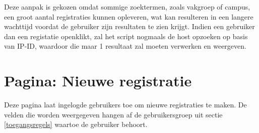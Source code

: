 Deze aanpak is gekozen omdat sommige zoektermen, zoals vakgroep of campus, een groot aantal registraties kunnen opleveren, wat kan resulteren in een langere wachttijd voordat de gebruiker zijn resultaten te zien krijgt. Indien een gebruiker dan een registatie openklikt, zal het script nogmaals de host opzoeken op basis van IP-ID, waardoor die maar 1 resultaat zal moeten verwerken en weergeven.

\section{Pagina: Nieuwe registratie}
\label{nieuwe-registratie}
Deze pagina laat ingelogde gebruikers toe om nieuwe registraties te maken. De velden die worden weergegeven hangen af de gebruikersgroep uit sectie \ref{toegangsregels} waartoe de gebruiker behoort.

